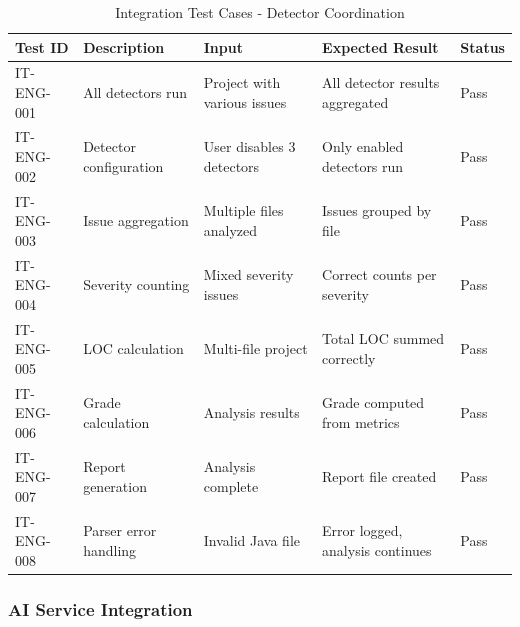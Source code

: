 \documentclass[12pt,a4paper]{article}
\begin{document}
    \begin{table}[H]
        \caption{Integration Test Cases - Detector Coordination}
        \begin{tabular}{|p{2cm}|p{4cm}|p{3cm}|p{3cm}|p{1.5cm}|}
            \hline
            \textbf{Test ID} & \textbf{Description} & \textbf{Input} & \textbf{Expected Result} & \textbf{Status} \\
            \hline
            IT-ENG-001 & All detectors run & Project with various issues & All detector results aggregated & Pass \\
            \hline
            IT-ENG-002 & Detector configuration & User disables 3 detectors & Only enabled detectors run & Pass \\
            \hline
            IT-ENG-003 & Issue aggregation & Multiple files analyzed & Issues grouped by file & Pass \\
            \hline
            IT-ENG-004 & Severity counting & Mixed severity issues & Correct counts per severity & Pass \\
            \hline
            IT-ENG-005 & LOC calculation & Multi-file project & Total LOC summed correctly & Pass \\
            \hline
            IT-ENG-006 & Grade calculation & Analysis results & Grade computed from metrics & Pass \\
            \hline
            IT-ENG-007 & Report generation & Analysis complete & Report file created & Pass \\
            \hline
            IT-ENG-008 & Parser error handling & Invalid Java file & Error logged, analysis continues & Pass \\
            \hline
        \end{tabular}
    \end{table}

    \subsubsection{AI Service Integration}
\end{document}
